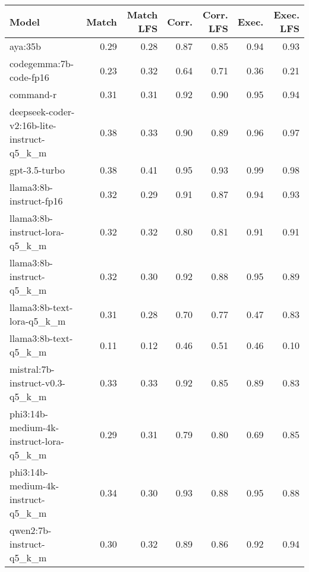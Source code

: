 \begin{tabular}{lrrrrrr}
\toprule
Model & Match & Match LFS & Corr. & Corr. LFS & Exec. & Exec. LFS \\
\midrule
aya:35b & 0.29 & 0.28 & 0.87 & 0.85 & 0.94 & 0.93 \\
codegemma:7b-code-fp16 & 0.23 & 0.32 & 0.64 & 0.71 & 0.36 & 0.21 \\
command-r & 0.31 & 0.31 & 0.92 & 0.90 & 0.95 & 0.94 \\
deepseek-coder-v2:16b-lite-instruct-q5\_k\_m & 0.38 & 0.33 & 0.90 & 0.89 & 0.96 & 0.97 \\
gpt-3.5-turbo & 0.38 & 0.41 & 0.95 & 0.93 & 0.99 & 0.98 \\
llama3:8b-instruct-fp16 & 0.32 & 0.29 & 0.91 & 0.87 & 0.94 & 0.93 \\
llama3:8b-instruct-lora-q5\_k\_m & 0.32 & 0.32 & 0.80 & 0.81 & 0.91 & 0.91 \\
llama3:8b-instruct-q5\_k\_m & 0.32 & 0.30 & 0.92 & 0.88 & 0.95 & 0.89 \\
llama3:8b-text-lora-q5\_k\_m & 0.31 & 0.28 & 0.70 & 0.77 & 0.47 & 0.83 \\
llama3:8b-text-q5\_k\_m & 0.11 & 0.12 & 0.46 & 0.51 & 0.46 & 0.10 \\
mistral:7b-instruct-v0.3-q5\_k\_m & 0.33 & 0.33 & 0.92 & 0.85 & 0.89 & 0.83 \\
phi3:14b-medium-4k-instruct-lora-q5\_k\_m & 0.29 & 0.31 & 0.79 & 0.80 & 0.69 & 0.85 \\
phi3:14b-medium-4k-instruct-q5\_k\_m & 0.34 & 0.30 & 0.93 & 0.88 & 0.95 & 0.88 \\
qwen2:7b-instruct-q5\_k\_m & 0.30 & 0.32 & 0.89 & 0.86 & 0.92 & 0.94 \\
\bottomrule
\end{tabular}
